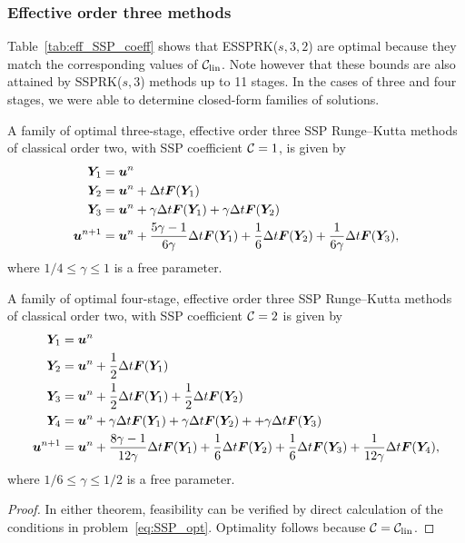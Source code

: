 \subsubsection{Effective order three methods}\label{subsubsec:3rd_ESSPRK}
Table~\ref{tab:eff_SSP_coeff} shows that ESSPRK($s,3,2$) are 
optimal because they match the corresponding values of $\mathcal{C}_{\text{lin}}$.
Note however that these bounds are also attained by SSPRK($s,3$) methods 
up to 11 stages. 
In the cases of three and four stages, we were able to determine closed-form 
families of solutions.
\begin{theorem}\label{thm:ESSPRK(3,3,2)}
	A family of optimal three-stage, effective order three SSP Runge--Kutta 
	methods of classical order two, with SSP coefficient $\mathcal{C}=1$, is given by
    \begin{displaymath}
    		\begin{split}
    			\bm{Y}_1 &= \bm{u}^n \\
    			\bm{Y}_2 &= \bm{u}^n + \Delta t\bm{F}(\bm{Y}_1) \\
    			\bm{Y}_3 &= \bm{u}^n + \gamma\Delta t\bm{F}(\bm{Y}_1) + \gamma\Delta t\bm{F}(\bm{Y}_2) \\
    			\bm{u}^{n+1} &= \bm{u}^n + \frac{5\gamma-1}{6\gamma}\Delta t\bm{F}(\bm{Y}_1) + \frac{1}{6}\Delta t\bm{F}(\bm{Y}_2) + \frac{1}{6\gamma}\Delta t\bm{F}(\bm{Y}_3),
        \end{split}
    \end{displaymath}
    where $1/4 \leq \gamma \leq 1$ is a free parameter.
\end{theorem}
\begin{theorem}\label{thm:ESSPRK(4,3,2)}
	A family of optimal four-stage, effective order three SSP Runge--Kutta 
	methods of classical order two, with SSP coefficient $\mathcal{C}=2$ is given by
    \begin{displaymath}
    		\begin{split}
    			\bm{Y}_1 &= \bm{u}^n \\
    			\bm{Y}_2 &= \bm{u}^n + \frac{1}{2}\Delta t\bm{F}(\bm{Y}_1) \\
    			\bm{Y}_3 &= \bm{u}^n + \frac{1}{2}\Delta t\bm{F}(\bm{Y}_1) + \frac{1}{2}\Delta t\bm{F}(\bm{Y}_2) \\
    			\bm{Y}_4 &= \bm{u}^n + \gamma\Delta t\bm{F}(\bm{Y}_1) + \gamma\Delta t\bm{F}(\bm{Y}_2) + + \gamma\Delta t\bm{F}(\bm{Y}_3) \\
    			\bm{u}^{n+1} &= \bm{u}^n + \frac{8\gamma-1}{12\gamma}\Delta t\bm{F}(\bm{Y}_1) + \frac{1}{6}\Delta t\bm{F}(\bm{Y}_2) + \frac{1}{6}\Delta t\bm{F}(\bm{Y}_3) + \frac{1}{12\gamma}\Delta t\bm{F}(\bm{Y}_4),
        \end{split}
    \end{displaymath}
    where $ 1/6 \leq \gamma \leq 1/2 $ is a free parameter.
\end{theorem}
\begin{proof}
	In either theorem, feasibility can be verified by direct calculation of the 
	conditions in problem~\eqref{eq:SSP_opt}. Optimality follows because 
	$\mathcal{C}=\mathcal{C}_{\text{lin}}$.
\end{proof}

